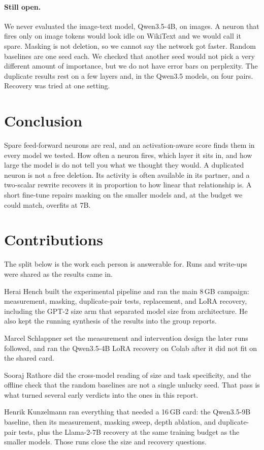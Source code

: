 \documentclass{article}
\begin{document}
\paragraph{Still open.}
We never evaluated the image-text model, Qwen3.5-4B, on images.
A neuron that fires only on image tokens would look idle on WikiText and we would call it spare.
Masking is not deletion, so we cannot say the network got faster.
Random baselines are one seed each.
We checked that another seed would not pick a very different amount of importance, but we do not have error bars on perplexity.
The duplicate results rest on a few layers and, in the Qwen3.5 models, on four pairs.
Recovery was tried at one setting.

\section{Conclusion}
\label{sec:conclusion}

Spare feed-forward neurons are real, and an activation-aware score finds them in every model we tested.
How often a neuron fires, which layer it sits in, and how large the model is do not tell you what we thought they would.
A duplicated neuron is not a free deletion.
Its activity is often available in its partner, and a two-scalar rewrite recovers it in proportion to how linear that relationship is.
A short fine-tune repairs masking on the smaller models and, at the budget we could match, overfits at 7B.

\section*{Contributions}

The split below is the work each person is answerable for.
Runs and write-ups were shared as the results came in.

Herai Hench built the experimental pipeline and ran the main 8\,GB campaign: measurement, masking, duplicate-pair tests, replacement, and LoRA recovery, including the GPT-2 size arm that separated model size from architecture.
He also kept the running synthesis of the results into the group reports.

Marcel Schlappner set the measurement and intervention design the later runs followed, and ran the Qwen3.5-4B LoRA recovery on Colab after it did not fit on the shared card.

Sooraj Rathore did the cross-model reading of size and task specificity, and the offline check that the random baselines are not a single unlucky seed.
That pass is what turned several early verdicts into the ones in this report.

Henrik Kunzelmann ran everything that needed a 16\,GB card: the Qwen3.5-9B baseline, then its measurement, masking sweep, depth ablation, and duplicate-pair tests, plus the Llama-2-7B recovery at the same training budget as the smaller models.
Those runs close the size and recovery questions.



\end{document}

